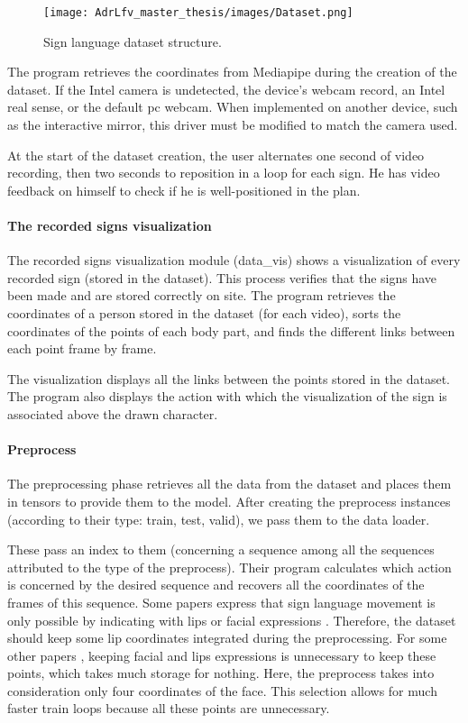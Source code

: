\begin{figure}[h]
    \centering
    \texttt{[image: AdrLfv\_master\_thesis/images/Dataset.png]}
    \caption{Sign language dataset structure.}
    \label{fig:slr_dataset}
\end{figure}

The program retrieves the coordinates from Mediapipe during the creation of the dataset. If the Intel camera is undetected, the device's webcam record, an Intel real sense, or the default pc webcam. When implemented on another device, such as the interactive mirror, this driver must be modified to match the camera used.

At the start of the dataset creation, the user alternates one second of video recording, then two seconds to reposition in a loop for each sign. He has video feedback on himself to check if he is well-positioned in the plan.

\paragraph{The recorded signs visualization}

The recorded signs visualization module (data\_vis) shows a visualization of every recorded sign (stored in the dataset). This process verifies that the signs have been made and are stored correctly on site.
The program retrieves the coordinates of a person stored in the dataset (for each video), sorts the coordinates of the points of each body part, and finds the different links between each point frame by frame. 

The visualization displays all the links between the points stored in the dataset. The program also displays the action with which the visualization of the sign is associated above the drawn character.

\paragraph{Preprocess}

The preprocessing phase retrieves all the data from the dataset and places them in tensors to provide them to the model.
After creating the preprocess instances (according to their type: train, test, valid), we pass them to the data loader. 

These pass an index to them (concerning a sequence among all the sequences attributed to the type of the preprocess). Their program calculates which action is concerned by the desired sequence and recovers all the coordinates of the frames of this sequence. 
Some papers express that sign language movement is only possible by indicating with lips or facial expressions \cite{cooper2011sign}. Therefore, the dataset should keep some lip coordinates integrated during the preprocessing. For some other papers \cite{dreuw2007speech}, keeping facial and lips expressions is unnecessary to keep these points, which takes much storage for nothing. Here, the preprocess takes into consideration only four coordinates of the face. This selection allows for much faster train loops because all these points are unnecessary.

